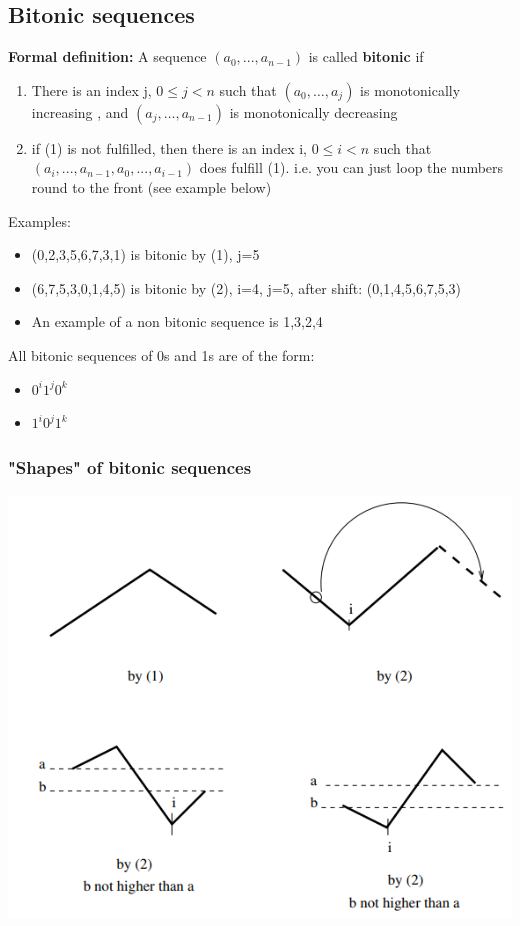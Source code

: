 \documentclass{article}[18pt]
\begin{document}
\subsection{Bitonic sequences}
\textbf{Formal definition:} A sequence $(a_0,...,a_{n-1})$ is called \textbf{bitonic} if
\begin{enumerate}
	\item There is an index j, $0\leqslant j< n$ such that $(a_0,\ldots,a_j)$ is monotonically increasing , and $(a_j,\ldots ,a_{n-1})$ is monotonically decreasing
	\item if (1) is not fulfilled, then there is an index i, $0\leqslant i <n$ such that $(a_i,...,a_{n-1},a_0,...,a_{i-1})$ does fulfill (1). i.e. you can just loop the numbers round to the front (see example below)
\end{enumerate}
Examples:
\begin{itemize}
	\item (0,2,3,5,6,7,3,1) is bitonic by (1), j=5
	\item (6,7,5,3,0,1,4,5) is bitonic by (2), i=4, j=5, after shift: (0,1,4,5,6,7,5,3)
	\item An example of a non bitonic sequence is 1,3,2,4
\end{itemize}
All bitonic sequences of 0s and 1s are of the form:
\begin{itemize}
	\item $0^i1^j0^k$
	\item $1^i0^j1^k$
\end{itemize}
\subsubsection{"Shapes" of bitonic sequences}
\begin{center}
	\includegraphics[scale=0.7]{shapes}
\end{center}
\end{document}

